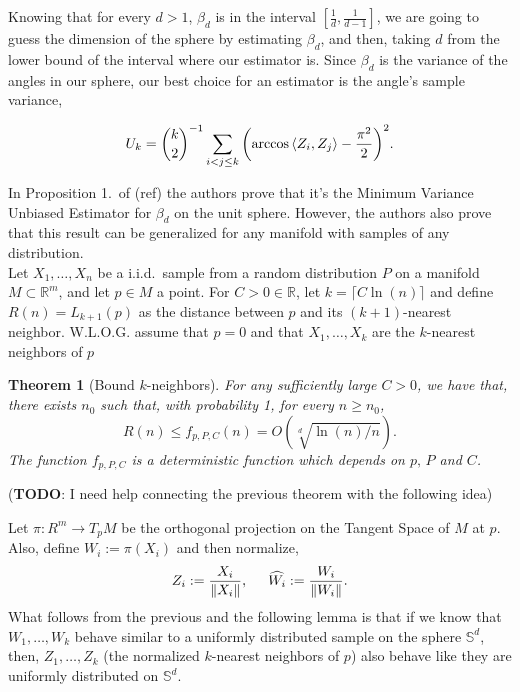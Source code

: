 \documentclass[12pt]{exam}
\def\R{\ensuremath{\mathbb{R}}}
\def\S{\ensuremath{\mathbb{S}}}
\newtheorem{theorem}{Theorem}[section]
\theoremstyle{remark}
\newcommand{\angles}[1]{\ensuremath{\left\langle}#1\ensuremath{\right\rangle} }
\begin{document}
Knowing that for every $d > 1$, $\beta_d$ is in the interval $[\tfrac{1}{d}, \tfrac{1}{d-1}]$, we are going to guess the dimension of the sphere by estimating $\beta_d$, and then, taking $d$ from the lower bound of the interval where our estimator is. Since $\beta_d$ is the variance of the angles in our sphere, our best choice for an estimator is the angle's sample variance,


\begin{equation}\label{ade:2}
  U_{k} = \binom{k}{2}^{-1} \sum_{i<j\leq k}{\left(
    \arccos\angles{Z_i, Z_j} - \frac{\pi^2}{2} 
    \right)}^{2}.
\end{equation}

In Proposition 1.\ of (ref) the authors prove that it's the Minimum Variance Unbiased Estimator for $\beta_d$ on the unit sphere. However, the authors also prove that this result can be generalized for any manifold with samples of any distribution.\\[5mm]

Let $X_1,\ldots, X_n$ be a i.i.d.\ sample from a random distribution $P$ on a manifold $M \subset \R^m$, and let $p \in M$ a point. For $C>0 \in  \R$, let $k = \lceil C \ln(n)\rceil$ and define $R(n) = L_{k+1}(p)$ as the distance between $p$ and its $(k+1)$-nearest neighbor. W.L.O.G. assume that $p = 0$ and that $X_1,\ldots, X_k$ are the $k$-nearest neighbors of $p$

\begin{theorem}[Bound $k$-neighbors]\label{ade:T2}
  For any sufficiently large $C > 0$, we have that, there exists $n_0$ such that, with probability 1, for every $n \geq n_0$,
  \begin{equation}\label{ade:3}
    R(n) \leq f_{p,P,C}(n) = O(\sqrt[d]{\ln(n)/n}).
  \end{equation}
  The function $f_{p,P,C}$ is a deterministic function which depends on $p,\, P$ and $C$.
\end{theorem}

(\textbf{TODO}: I need help connecting the previous theorem with the following idea)

Let $\pi : R^m \to T_p M$ be the orthogonal projection on the Tangent Space of $M$ at $p$. Also, define $W_i := \pi(X_i)$ and then normalize,
\[ Z_i := \frac{X_i}{\|X_i\|},\hspace*{5mm} \widehat{W_i} := \frac{W_i}{\|W_i\|}. \] 
What follows from the previous and the following lemma is that if we know that $W_1,\ldots, W_k$ behave similar to a uniformly distributed sample on the sphere $\S^d$, then, $Z_1,\ldots, Z_k$ (the normalized $k$-nearest neighbors of $p$) also behave like they are uniformly distributed on $\S^d$.
\end{document}
